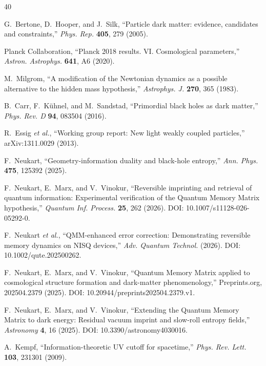 ﻿\documentclass[12pt,a4paper]{article}
\begin{document}
\begin{thebibliography}{40}

G.~Bertone, D.~Hooper, and J.~Silk,
``Particle dark matter: evidence, candidates and constraints,''
\textit{Phys. Rep.} \textbf{405}, 279 (2005).

Planck Collaboration,
``Planck 2018 results. VI. Cosmological parameters,''
\textit{Astron. Astrophys.} \textbf{641}, A6 (2020).

M.~Milgrom,
``A modification of the Newtonian dynamics as a possible alternative to the hidden mass hypothesis,''
\textit{Astrophys. J.} \textbf{270}, 365 (1983).

B.~Carr, F.~K\"uhnel, and M.~Sandstad,
``Primordial black holes as dark matter,''
\textit{Phys. Rev. D} \textbf{94}, 083504 (2016).

R.~Essig \textit{et al.},
``Working group report: New light weakly coupled particles,''
arXiv:1311.0029 (2013).

F.~Neukart,
``Geometry-information duality and black-hole entropy,''
\textit{Ann. Phys.} \textbf{475}, 125392 (2025).

F.~Neukart, E.~Marx, and V.~Vinokur,
``Reversible imprinting and retrieval of quantum information: Experimental verification of the Quantum Memory Matrix hypothesis,''
\textit{Quantum Inf. Process.} \textbf{25}, 262 (2026).
DOI: 10.1007/s11128-026-05292-0.

F.~Neukart \textit{et al.},
``QMM-enhanced error correction: Demonstrating reversible memory dynamics on NISQ devices,''
\textit{Adv. Quantum Technol.} (2026).
DOI: 10.1002/qute.202500262.

F.~Neukart, E.~Marx, and V.~Vinokur,
``Quantum Memory Matrix applied to cosmological structure formation and dark-matter phenomenology,''
Preprints.org, 202504.2379 (2025).
DOI: 10.20944/preprints202504.2379.v1.

F.~Neukart, E.~Marx, and V.~Vinokur,
``Extending the Quantum Memory Matrix to dark energy: Residual vacuum imprint and slow-roll entropy fields,''
\textit{Astronomy} \textbf{4}, 16 (2025).
DOI: 10.3390/astronomy4030016.

A.~Kempf,
``Information-theoretic UV cutoff for spacetime,''
\textit{Phys. Rev. Lett.} \textbf{103}, 231301 (2009).


\end{thebibliography}
\end{document}
